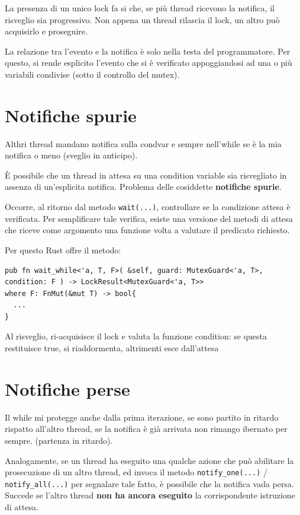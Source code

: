 La presenza di un unico lock fa si che, se più thread ricevono la notifica, il risveglio
sia progressivo. Non appena un thread rilascia il lock, un altro può acquisirlo e proseguire.

La relazione tra l'evento e la notifica è solo nella testa del programmatore.
Per questo, si rende esplicito l'evento che si è verificato appoggiandosi ad una
o più variabili condivise (sotto il controllo del mutex).


\section{Notifiche spurie}
Althri thread mandano notifica sulla condvar e sempre nell'while se è la mia notifica o meno
(sveglio in anticipo).

È possibile che un thread in attesa su una condition variable sia risvegliato in
assenza di un'esplicita notifica. Problema delle cosiddette \textbf{notifiche spurie}.

Occorre, al ritorno dal metodo \verb|wait(...)|, controllare se la condizione
attesa è verificata. Per semplificare tale verifica, esiste una versione del
metodi di attesa che riceve come argomento una funzione volta a valutare il
predicato richiesto.

Per questo Rust offre il metodo:


\begin{verbatim}
pub fn wait_while<'a, T, F>( &self, guard: MutexGuard<'a, T>, condition: F ) -> LockResult<MutexGuard<'a, T>>
where F: FnMut(&mut T) -> bool{
  ...
}
\end{verbatim}


Al risveglio, ri-acquisisce il lock e valuta la funzione condition: se questa restituisce true, si riaddormenta,
altrimenti esce dall'attesa

\section{Notifiche perse}
Il while mi protegge anche dalla prima iterazione, se sono partito in ritardo rispatto
all'altro thread, se la notifica è già arrivata non rimango ibernato per sempre.
(partenza in ritardo).


Analogamente, se un thread ha eseguito una qualche azione che può abilitare la
prosecuzione di un altro thread, ed invoca il metodo \verb|notify_one(...)| / \verb|notify_all(...)|
per segnalare tale fatto, è possibile che la notifica vada persa.
Succede se l'altro thread \textbf{non ha ancora eseguito} la corrispondente istruzione di attesa.


